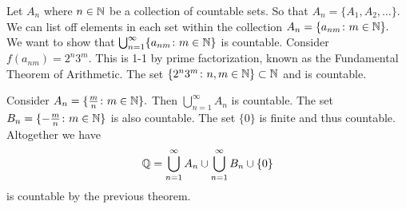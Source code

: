 \documentclass{report}
\begin{document}
  \begin{myproof}
    Let $A_n$ where $n \in \NN$ be a collection of countable sets. So that  $A_n = \{A_1, A_2, \dots \}.$ We can list off elements in each set within the collection $A_n = \{a_{nm} \colon m \in \NN\}.$ We want to show that $\bigcup_{n=1}^{\infty}\{a_{nm} \colon m \in \NN\}$ is countable. Consider $f(a_{nm}) = 2^n3^m.$ This is 1-1 by prime factorization, known as the Fundamental Theorem of Arithmetic. The set $\{2^n3^m \colon n,m \in \NN \} \subset \NN$ and is countable.
  \end{myproof}


  \begin{myproof}
    Consider $A_n = \{ \frac{m}{n} \colon m \in \NN \}.$ Then $
    \bigcup_{n=1}^{\infty} A_n$ is countable. The set $B_n = \{ -\frac{m}{n} \colon m \in \NN \}$ is also countable. The set $\{0\}$ is finite and thus countable. Altogether we have $$ \QQ = \bigcup_{n=1}^{\infty} A_n \cup \bigcup_{n=1}^{\infty} B_n \cup \{0\}$$ is countable by the previous theorem.
  \end{myproof}
\end{document}
